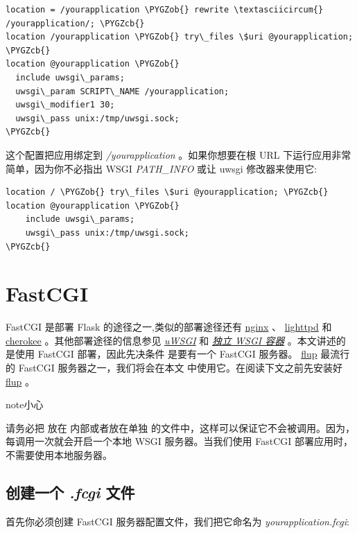 \documentclass[a4paper,12pt]{sphinxmanual}
\def\PYGZob{\char`\{}
\def\PYGZcb{\char`\}}
\begin{document}
\begin{Verbatim}[commandchars=\\\{\}]
location = /yourapplication \PYGZob{} rewrite \textasciicircum{} /yourapplication/; \PYGZcb{}
location /yourapplication \PYGZob{} try\_files \$uri @yourapplication; \PYGZcb{}
location @yourapplication \PYGZob{}
  include uwsgi\_params;
  uwsgi\_param SCRIPT\_NAME /yourapplication;
  uwsgi\_modifier1 30;
  uwsgi\_pass unix:/tmp/uwsgi.sock;
\PYGZcb{}
\end{Verbatim}

这个配置把应用绑定到 \emph{/yourapplication} 。如果你想要在根 URL 下运行应用非常
简单，因为你不必指出 WSGI \emph{PATH\_INFO} 或让 uwsgi 修改器来使用它:

\begin{Verbatim}[commandchars=\\\{\}]
location / \PYGZob{} try\_files \$uri @yourapplication; \PYGZcb{}
location @yourapplication \PYGZob{}
    include uwsgi\_params;
    uwsgi\_pass unix:/tmp/uwsgi.sock;
\PYGZcb{}
\end{Verbatim}


\section{FastCGI}
\label{deploying/fastcgi:deploying-fastcgi}\label{deploying/fastcgi::doc}\label{deploying/fastcgi:id3}\label{deploying/fastcgi:fastcgi}
FastCGI 是部署 Flask 的途径之一,类似的部署途径还有 \href{http://nginx.org/}{nginx}  、 \href{http://www.lighttpd.net/}{lighttpd} 和
\href{http://www.cherokee-project.com/}{cherokee} 。其他部署途径的信息参见 {\hyperref[deploying/uwsgi:deploying-uwsgi]{\emph{uWSGI}}} 和
{\hyperref[deploying/wsgi-standalone:deploying-wsgi-standalone]{\emph{独立 WSGI 容器}}} 。本文讲述的是使用 FastCGI 部署，因此先决条件
是要有一个 FastCGI 服务器。 \href{http://trac.saddi.com/flup}{flup} 最流行的 FastCGI 服务器之一，我们将会在本文
中使用它。在阅读下文之前先安装好 \href{http://trac.saddi.com/flup}{flup} 。

\begin{notice}{note}{小心}

请务必把  放在  内部或者放在单独
的文件中，这样可以保证它不会被调用。因为，每调用一次就会开启一个本地 WSGI
服务器。当我们使用 FastCGI 部署应用时，不需要使用本地服务器。
\end{notice}


\subsection{创建一个 \emph{.fcgi} 文件}
\label{deploying/fastcgi:fcgi}
首先你必须创建 FastCGI 服务器配置文件，我们把它命名为 \emph{yourapplication.fcgi}:
\end{document}
